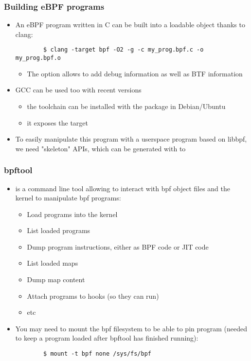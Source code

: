 \begin{frame}[fragile]
  \frametitle{Building eBPF programs}
  \begin{itemize}
    \item An eBPF program written in C can be built into a loadable object
    thanks to clang:
    \begin{block}{}
      \begin{verbatim}
        $ clang -target bpf -O2 -g -c my_prog.bpf.c -o my_prog.bpf.o
      \end{verbatim}
    \end{block}
    \begin{itemize}
        \item The  option allows to add debug information as well as
        BTF information
    \end{itemize}
    \item GCC can be used too with recent versions
    \begin{itemize}
      \item the toolchain can be installed with the  package in
      Debian/Ubuntu
      \item it exposes the  target
    \end{itemize}
    \item To easily manipulate this program with a userspace program based on libbpf,
    we need "skeleton" APIs, which can be generated with to 
  \end{itemize}
\end{frame}

\begin{frame}[fragile]
  \frametitle{bpftool}
  \begin{itemize}
    \item {} is a command line tool allowing to interact with bpf
    object files and the kernel to manipulate bpf programs:
    \begin{itemize}
      \item Load programs into the kernel
      \item List loaded programs
      \item Dump program instructions, either as BPF code or JIT code
      \item List loaded maps
      \item Dump map content
      \item Attach programs to hooks (so they can run)
      \item etc
    \end{itemize}
    \item You may need to mount the bpf filesystem to be able to pin program
    (needed to keep a program loaded after bpftool has finished running):
    \begin{block}{}
      \begin{verbatim}
        $ mount -t bpf none /sys/fs/bpf
      \end{verbatim}
    \end{block}
  \end{itemize}
\end{frame}

